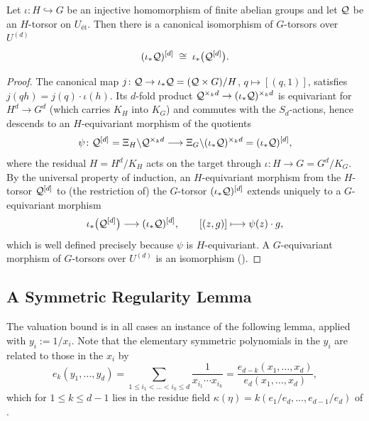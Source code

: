 \begin{lemma}\label{lemma:sym_power_induced}
    Let $\iota : H \hookrightarrow G$ be an injective homomorphism of finite
    abelian groups and let $\mathcal{Q}$ be an $H$-torsor on $U_{\text{ét}}$. Then
    there is a canonical isomorphism of $G$-torsors over $U^{(d)}$
    \[
        (\iota_* \mathcal{Q})^{[d]} \;\cong\; \iota_*\bigl(\mathcal{Q}^{[d]}\bigr).
    \]
\end{lemma}
\begin{proof}
    The canonical map $j \colon \mathcal{Q} \to \iota_*\mathcal{Q} = (\mathcal{Q} \times G)/H$,
    $q \mapsto [(q, 1)]$, satisfies $j(qh) = j(q)\cdot\iota(h)$. Its $d$-fold
    product $\mathcal{Q}^{\times_k d} \to (\iota_*\mathcal{Q})^{\times_k d}$ is equivariant
    for $H^d \to G^d$ (which carries $K_H$ into $K_G$) and commutes with the
    $S_d$-actions, hence descends to an $H$-equivariant morphism of the
    quotients
    \[
        \psi \colon \mathcal{Q}^{[d]} = \Xi_H \backslash \mathcal{Q}^{\times_k d}
        \longrightarrow \Xi_G \backslash (\iota_*\mathcal{Q})^{\times_k d}
        = (\iota_*\mathcal{Q})^{[d]},
    \]
    where the residual $H = H^d/K_H$ acts on the target through
    $\iota : H \to G = G^d/K_G$. By the universal property of induction, an
    $H$-equivariant morphism from the $H$-torsor $\mathcal{Q}^{[d]}$ to (the
    restriction of) the $G$-torsor $(\iota_*\mathcal{Q})^{[d]}$ extends uniquely to a
    $G$-equivariant morphism
    \[
        \iota_*\bigl(\mathcal{Q}^{[d]}\bigr) \longrightarrow (\iota_*\mathcal{Q})^{[d]},
        \qquad [(z, g)] \longmapsto \psi(z) \cdot g,
    \]
    which is well defined precisely because $\psi$ is $H$-equivariant. A
    $G$-equivariant morphism of $G$-torsors over $U^{(d)}$ is an isomorphism
    ().
\end{proof}

\subsection*{A Symmetric Regularity Lemma}

The valuation bound is in all cases an instance of the following lemma, applied
with $y_i := 1/x_i$. Note that the elementary symmetric polynomials in the
$y_i$ are related to those in the $x_i$ by
\begin{equation}\label{eq:elementary_symmetric_inverse_variables}
    e_k(y_1, \dots, y_d)
    = \sum_{1 \le i_1 < \dots < i_k \le d} \frac{1}{x_{i_1} \cdots x_{i_k}}
    = \frac{e_{d-k}(x_1, \dots, x_d)}{e_d(x_1, \dots, x_d)},
\end{equation}
which for $1 \leq k \leq d-1$ lies in the residue field
$\kappa(\eta) = k(e_1/e_d, \dots, e_{d-1}/e_d)$ of
.


